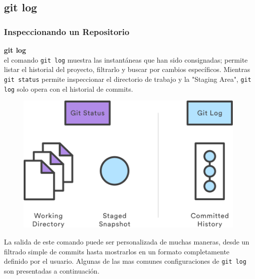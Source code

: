\documentclass[8pt]{beamer}
\begin{document}
\subsection{git log}
\begin{frame}
\frametitle{Inspeccionando un Repositorio}
\textbf{git log}\\
\medskip
el comando \texttt{git log} muestra las instant\'aneas que han sido consignadas; permite listar el historial del proyecto, filtrarlo y buscar por cambios espec\'ificos. Mientras \texttt{git status} permite inspeccionar el directorio de trabajo y la "Staging Area", \texttt{git log} solo opera con el historial de commits.\\
\medskip
\begin{figure}
  \centering
  \includegraphics[scale=0.4]{imagenes/06.png}
\end{figure}
La salida de este comando puede ser personalizada de muchas maneras, desde un filtrado simple de commits hasta mostrarlos en un formato completamente definido por el usuario. Algunas de las mas comunes configuraciones de \texttt{git log} son presentadas a continuaci\'on.


\end{frame}
\end{document}
